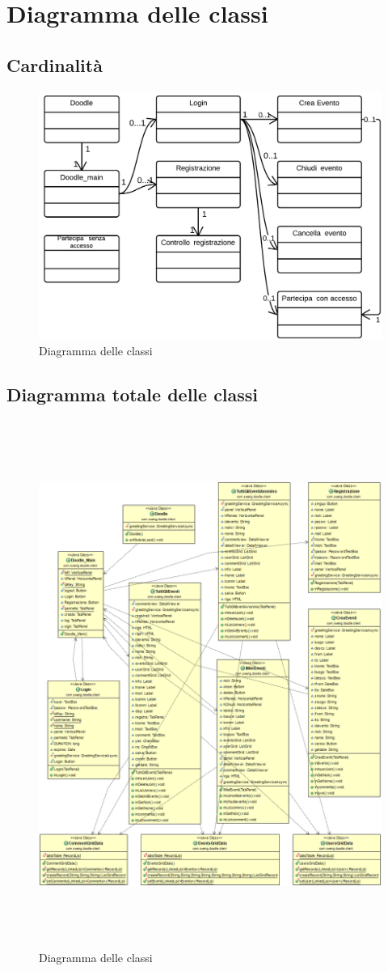 \chapter{Diagramma delle classi}

\section{Cardinalità}
\begin{figure}[H]
\centering
\includegraphics[scale=0.30]{img/classi/classi.png}
\caption{Diagramma delle classi}
\label{fig:classicard}
\end{figure}

\section{Diagramma totale delle classi}
\begin{figure}[!ht]
\centering
\includegraphics[width=14cm, height=17.2cm]{img/classi/diagrammaclassi.png}
\caption{Diagramma delle classi}
\label{fig:diagclassi}
\end{figure}